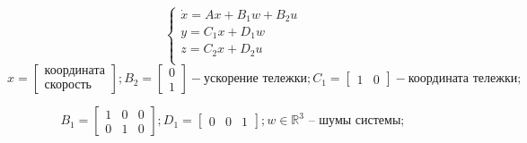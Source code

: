 \[
        \begin{cases}
                \dot{x} = A x + B_1 w + B_2 u \\
                y = C_1x + D_1 w  \\
                z = C_2x + D_2 u  \\
        \end{cases}
\]
\[x = \begin{bmatrix}
    \text{координата} \\ 
    \text{скорость}
  \end{bmatrix}; 
  B_2 = \begin{bmatrix}
    0 \\ 
    1
  \end{bmatrix} - \text{ускорение тележки};
  C_1 = \begin{bmatrix}
    1 & 0
  \end{bmatrix} - \text{координата тележки};
\]

\[
  B_1 = \begin{bmatrix}
    1 & 0 & 0 \\ 
    0 & 1 & 0
  \end{bmatrix};
  D_1 = \begin{bmatrix}
    0 & 0 & 1
  \end{bmatrix};
  w \in \mathds{R}^3 \text{ -- шумы системы};
\]

\FloatBarrier
